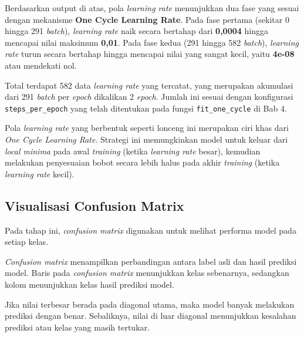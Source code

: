 Berdasarkan output di atas, pola \textit{learning rate} menunjukkan dua fase yang sesuai dengan mekanisme \textbf{One Cycle Learning Rate}. Pada fase pertama (sekitar 0 hingga 291 \textit{batch}), \textit{learning rate} naik secara bertahap dari \textbf{0,0004} hingga mencapai nilai maksimum \textbf{0,01}. Pada fase kedua (291 hingga 582 \textit{batch}), \textit{learning rate} turun secara bertahap hingga mencapai nilai yang sangat kecil, yaitu \textbf{4e-08} atau mendekati nol.

Total terdapat 582 data \textit{learning rate} yang tercatat, yang merupakan akumulasi dari 291 \textit{batch} per \textit{epoch} dikalikan 2 \textit{epoch}. Jumlah ini sesuai dengan konfigurasi \texttt{steps\_per\_epoch} yang telah ditentukan pada fungsi \texttt{fit\_one\_cycle} di Bab 4.

Pola \textit{learning rate} yang berbentuk seperti lonceng ini merupakan ciri khas dari \textit{One Cycle Learning Rate}. Strategi ini memungkinkan model untuk keluar dari \textit{local minima} pada awal \textit{training} (ketika \textit{learning rate} besar), kemudian melakukan penyesuaian bobot secara lebih halus pada akhir \textit{training} (ketika \textit{learning rate} kecil).

\subsection{Visualisasi Confusion Matrix}

Pada tahap ini, \textit{confusion matrix} digunakan untuk melihat performa model pada setiap kelas.

\textit{Confusion matrix} menampilkan perbandingan antara label asli dan hasil prediksi model. Baris pada \textit{confusion matrix} menunjukkan kelas sebenarnya, sedangkan kolom menunjukkan kelas hasil prediksi model.

Jika nilai terbesar berada pada diagonal utama, maka model banyak melakukan prediksi dengan benar. Sebaliknya, nilai di luar diagonal menunjukkan kesalahan prediksi atau kelas yang masih tertukar.

